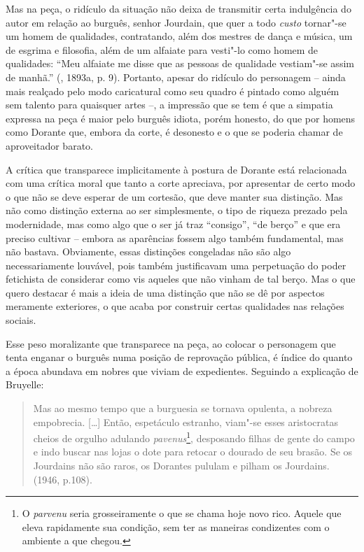 Mas na peça, o ridículo da situação não deixa de transmitir certa
indulgência do autor em relação ao burguês, senhor Jourdain, que quer a
todo \emph{custo} tornar"-se um homem de qualidades, contratando, além
dos mestres de dança e música, um de esgrima e filosofia, além de um
alfaiate para vesti"-lo como homem de qualidades: ``Meu alfaiate me
disse que as pessoas de qualidade vestiam"-se assim de manhã.''
(, 1893a, p. 9). Portanto, apesar do ridículo do personagem --
ainda mais realçado pelo modo caricatural como seu quadro é pintado como
alguém sem talento para quaisquer artes --, a impressão que se tem é que
a simpatia expressa na peça é maior pelo burguês idiota, porém honesto,
do que por homens como Dorante que, embora da corte, é desonesto e o que
se poderia chamar de aproveitador barato.

A crítica que transparece implicitamente à postura de Dorante está
relacionada com uma crítica moral que tanto a corte apreciava, por
apresentar de certo modo o que não se deve esperar de um cortesão, que
deve manter sua distinção. Mas não como distinção externa ao ser
simplesmente, o tipo de riqueza prezado pela modernidade, mas como algo
que o ser já traz ``consigo'', ``de berço'' e que era preciso cultivar
-- embora as aparências fossem algo também fundamental, mas não bastava.
Obviamente, essas distinções congeladas não são algo necessariamente
louvável, pois também justificavam uma perpetuação do poder fetichista de
considerar como vis aqueles que não vinham de tal berço. Mas o que
quero destacar é mais a ideia de uma distinção que não se dê por
aspectos meramente exteriores, o que acaba por construir certas
qualidades nas relações sociais.

Esse peso moralizante que transparece na peça, ao colocar o personagem
que tenta enganar o burguês numa posição de reprovação pública, é índice
do quanto a época abundava em nobres que viviam de expedientes. Seguindo
a explicação de Bruyelle:

\begin{quote}
Mas ao mesmo tempo que a burguesia se tornava opulenta, a nobreza
empobrecia. [\ldots{}] Então, espetáculo estranho, viam"-se esses
aristocratas cheios de orgulho adulando \emph{pavenus}\footnote{O
  \emph{parvenu} seria grosseiramente o que se chama hoje novo rico.
  Aquele que eleva rapidamente sua condição, sem ter as maneiras
  condizentes com o ambiente a que chegou.}, desposando filhas de gente
do campo e indo buscar nas lojas o dote para retocar o dourado de seu
brasão. Se os Jourdains não são raros, os Dorantes pululam e pilham os
Jourdains. (1946, p.108).
\end{quote}

